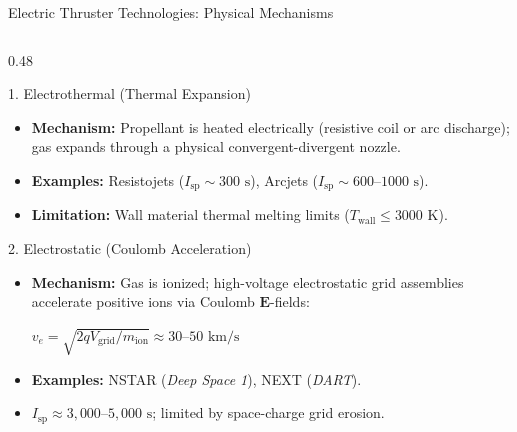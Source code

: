 \documentclass[aspectratio=169, 10pt]{beamer}
\begin{document}
\begin{frame}{Electric Thruster Technologies: Physical Mechanisms}
    \begin{columns}[T]
        \begin{column}{0.48\textwidth}
            \begin{block}{1. Electrothermal (Thermal Expansion)}
                \scriptsize
                \begin{itemize}\setlength{\itemsep}{1.2pt}\setlength{\topsep}{0pt}
                    \item \textbf{Mechanism:} Propellant is heated electrically (resistive coil or arc discharge); gas expands through a physical convergent-divergent nozzle.
                    \item \textbf{Examples:} Resistojets ($I_{\text{sp}} \sim 300\text{ s}$), Arcjets ($I_{\text{sp}} \sim 600\text{--}1000\text{ s}$).
                    \item \textbf{Limitation:} Wall material thermal melting limits ($T_{\text{wall}} \le 3000\text{ K}$).
                \end{itemize}
            \end{block}
            \vspace{-0.15cm}
            \begin{exampleblock}{2. Electrostatic (Coulomb Acceleration)}
                \scriptsize
                \begin{itemize}\setlength{\itemsep}{1.2pt}\setlength{\topsep}{0pt}
                    \item \textbf{Mechanism:} Gas is ionized; high-voltage electrostatic grid assemblies accelerate positive ions via Coulomb $\mathbf{E}$-fields:
                    \par\vspace{1pt}
                    {\centering $v_e = \sqrt{2 q V_{\text{grid}} / m_{\text{ion}}} \approx 30\text{--}50\text{ km/s}$ \par}
                    \item \textbf{Examples:} NSTAR (\textit{Deep Space 1}), NEXT (\textit{DART}).
                    \item $I_{\text{sp}} \approx 3{,}000\text{--}5{,}000\text{ s}$; limited by space-charge grid erosion.
                \end{itemize}
            \end{exampleblock}
        \end{column}


\end{columns}
\end{frame}
\end{document}

